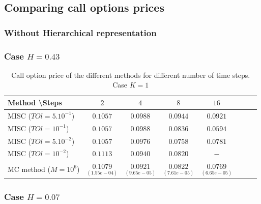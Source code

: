 \documentclass[11pt]{article}
\begin{document}
\newpage
\subsection{Comparing call options prices }\label{sec:Comparing call options prices rbergomi}


\subsubsection{Without Hierarchical representation}
\subsubsection*{Case $H=0.43$}
\begin{table}[h!]
	\centering
	\begin{tabular}{l*{6}{c}r}
		Method \textbackslash  Steps            & $2$ & $4$ & $8$ & $16$ &   \\
		\hline
		MISC ($TOl=5.10^{-1}$)  & $0.1057$ & $0.0988$ & $0.0944$ & $0.0921$  \\
		MISC ($TOl=10^{-1}$)  & $0.1057$ & $0.0988$ & $0.0836$ & $0.0594$  \\
		MISC ($TOl=5.10^{-2}$)  & $0.1057$ & $0.0976$ & $0.0758$ & $0.0781$  \\
		MISC ($TOl=10^{-2}$)  & $0.1113$ & $0.0940$ & $0.0820$ & $-$  \\
		MC method ($M=10^{6}$)   & $\underset{(1.55e-04)}{0.1079}$ & $ \underset{(9.65e-05)}{0.0921}$  & $ \underset{(7.61e-05)}{0.0822}$ & $ \underset{(6.65e-05)}{0.0769}$ \\		
		
		\hline
	\end{tabular}
	\caption{ Call option price of the different methods for different number of time steps. Case $K=1$}
	\label{table: Call option price of the different methods for different number of time steps. Case $K=1$}
\end{table}


\subsubsection*{Case $H=0.07$}
\end{document}
